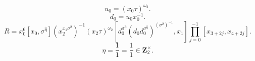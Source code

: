 \[u_0=(x_0\tau)^{\omega_2}.\]
\[d_0=u_0x_0^{-1}.\]
\[R=x_0^6[x_0,\sigma^{\widehat{\eta}}](x_2^{x_1\sigma^2})^{-1}(x_2\tau)^{\omega_2}[d_0^{\sigma^{\widehat{\eta}}}(d_0d_0^{\sigma^{\widehat{\eta}}})^{(\sigma^2)^{-1}},x_1]\prod_{j=0}^{-1}[x_{3+2j},x_{4+2j}].\]
\[\eta=\frac{1}{1}=\frac{1}{1}\in\mathbf Z_2^\times.\]
